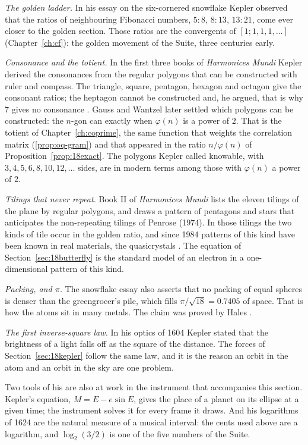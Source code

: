 \emph{The golden ladder.} In his essay on the six-cornered snowflake \cite{kepler1611} Kepler observed
that the ratios of neighbouring Fibonacci numbers, $5:8$, $8:13$, $13:21$, come ever closer to the golden
section. Those ratios are the convergents of $[1;1,1,1,\ldots]$ (Chapter~\ref{ch:cf}): the golden movement of the
Suite, three centuries early.

\emph{Consonance and the totient.} In the first three books of \emph{Harmonices Mundi} Kepler derived the
consonances from the regular polygons that can be constructed with ruler and compass. The triangle,
square, pentagon, hexagon and octagon give the consonant ratios; the heptagon cannot be constructed and,
he argued, that is why $7$ gives no consonance \cite{gingerich1973}. Gauss and Wantzel later settled which polygons can be
constructed: the $n$-gon can exactly when $\varphi(n)$ is a power of $2$. That is the totient of
Chapter~\ref{ch:coprime}, the same function that weights the correlation matrix (\cref{prop:oq-gram}) and that appeared in
the ratio $n/\varphi(n)$ of Proposition~\ref{prop:18exact}. The polygons Kepler called knowable, with
$3,4,5,6,8,10,12,\ldots$ sides, are in modern terms among those with $\varphi(n)$ a power of $2$.

\emph{Tilings that never repeat.} Book II of \emph{Harmonices Mundi} lists the eleven tilings of the plane
by regular polygons, and draws a pattern of pentagons and stars that anticipates the non-repeating
tilings of Penrose (1974). In those tilings the two kinds of tile occur in the golden ratio, and since 1984 patterns of
this kind have been known in real materials, the quasicrystals \cite{Shechtman1984}. The equation of Section~\ref{sec:18butterfly} is the standard model
of an electron in a one-dimensional pattern of this kind.

\emph{Packing, and $\pi$.} The snowflake essay also asserts that no packing of equal spheres is denser
than the greengrocer's pile, which fills $\pi/\sqrt{18}=0.7405$ of space. That is how the atoms sit in
many metals. The claim was proved by Hales \cite{hales2005}.

\emph{The first inverse-square law.} In his optics of 1604 Kepler stated that the brightness of a light
falls off as the square of the distance. The forces of Section~\ref{sec:18kepler} follow the same law,
and it is the reason an orbit in the atom and an orbit in the sky are one problem.

Two tools of his are also at work in the instrument that accompanies this section. Kepler's equation,
$M=E-e\sin E$, gives the place of a planet on its ellipse at a given time; the instrument solves it for
every frame it draws. And his logarithms of 1624 are the natural measure of a musical interval: the cents
used above are a logarithm, and $\log_2(3/2)$ is one of the five numbers of the Suite.

